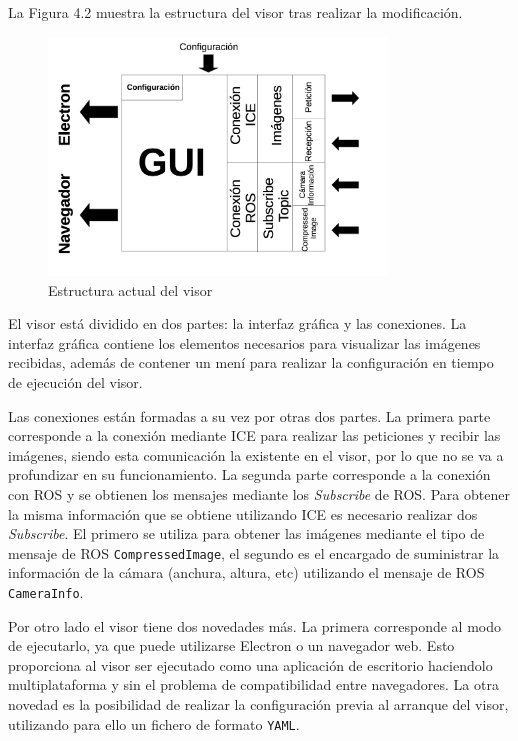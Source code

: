 La Figura 4.2 muestra la estructura del visor tras realizar la modificación.

\begin{figure}[H]
  \begin{center}
    \includegraphics[width=0.8\textwidth]{figures/Camviz2.png}
		\caption{Estructura actual del visor}
		\label{fig.estructuracamviz2}
		\end{center}
\end{figure}

El visor está dividido en dos partes: la interfaz gráfica y las conexiones. La interfaz gráfica contiene los elementos necesarios para visualizar las imágenes recibidas, además de contener un mení para realizar la configuración en tiempo de ejecución del visor.

Las conexiones están formadas a su vez por otras dos partes. La primera parte corresponde a la conexión mediante ICE para realizar las peticiones y recibir las imágenes, siendo esta comunicación la existente en el visor, por lo que no se va a profundizar en su funcionamiento. La segunda parte corresponde a la conexión con ROS y se obtienen los mensajes mediante los \textit{Subscribe} de ROS. Para obtener la misma información que se obtiene utilizando ICE es necesario realizar dos \textit{Subscribe}. El primero se utiliza para obtener las imágenes mediante el tipo de mensaje de ROS \texttt{CompressedImage}, el segundo es el encargado de suministrar la información de la cámara (anchura, altura, etc) utilizando el mensaje de ROS \texttt{CameraInfo}.

Por otro lado el visor tiene dos novedades más. La primera corresponde al modo de ejecutarlo, ya que puede utilizarse Electron o un navegador web. Esto proporciona al visor ser ejecutado como una aplicación de escritorio haciendolo multiplataforma y sin el problema de compatibilidad entre navegadores. La otra novedad es la posibilidad de realizar la configuración previa al arranque del visor, utilizando para ello un fichero de formato \texttt{YAML}.

